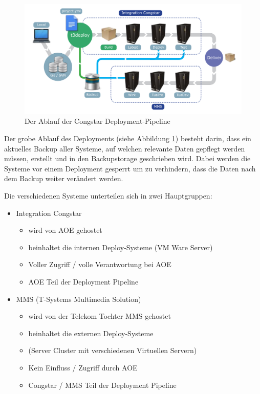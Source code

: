 \documentclass[11pt,a4paper]{article}
\begin{document}
\begin{figure}[H]
\includegraphics[width=\textwidth]{images/DeploymentPipeline.pdf}
\caption{Der Ablauf der Congstar Deployment-Pipeline}
\centering
\label{fig:pipe}
\end{figure}

Der grobe Ablauf des Deployments (siehe Abbildung \ref{fig:pipe}) besteht darin, dass ein aktuelles Backup aller Systeme, auf welchen relevante Daten gepflegt werden müssen, erstellt und in den Backupstorage geschrieben wird. Dabei werden die Systeme vor einem Deployment gesperrt um zu verhindern, dass die Daten nach dem Backup weiter verändert werden.

Die verschiedenen Systeme unterteilen sich in zwei Hauptgruppen:
\begin{itemize}
  \item Integration Congstar
  \begin{itemize}
    \item wird von AOE gehostet
    \item beinhaltet die internen Deploy-Systeme (VM Ware Server)
    \item Voller Zugriff / volle Verantwortung bei AOE
    \item AOE Teil der Deployment Pipeline
  \end{itemize}
  \item MMS (T-Systems Multimedia Solution)
  \begin{itemize}
    \item wird von der Telekom Tochter MMS gehostet
    \item beinhaltet die externen Deploy-Systeme
    \item (Server Cluster mit verschiedenen Virtuellen Servern)
    \item Kein Einfluss / Zugriff durch AOE
    \item Congstar / MMS Teil der Deployment Pipeline
  \end{itemize}
\end{itemize}
\end{document}
